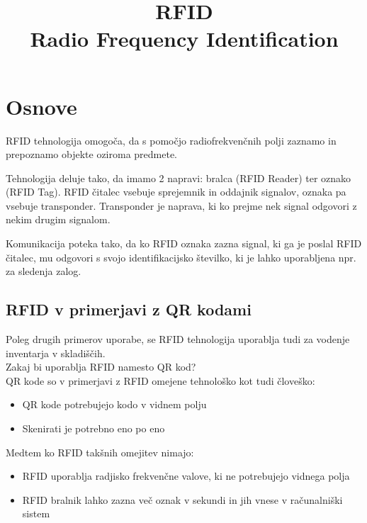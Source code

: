 \documentclass[]{article}
\title{RFID \\
       \large Radio Frequency Identification}
\date{}
\begin{document}
\maketitle

\clearpage

\tableofcontents

\clearpage

\section{Osnove}
RFID tehnologija omogo\v{c}a, da s pomo\v{c}jo radiofrekven\v{c}nih
polji zaznamo in prepoznamo objekte oziroma predmete.

Tehnologija deluje tako, da imamo 2 napravi: bralca (RFID Reader) ter
oznako (RFID Tag). RFID \v{c}italec vsebuje sprejemnik in oddajnik
signalov, oznaka pa vsebuje transponder. Transponder je naprava, ki
ko prejme nek signal odgovori z nekim drugim signalom.

Komunikacija poteka tako, da ko RFID oznaka zazna signal, ki ga je
poslal RFID \v{c}italec, mu odgovori s svojo identifikacijsko
\v{s}tevilko, ki je lahko uporabljena npr. za sledenja zalog.


\subsection{RFID v primerjavi z QR kodami}
Poleg drugih primerov uporabe, se RFID tehnologija uporablja
tudi za vodenje inventarja v skladi\v{s}\v{c}ih. \\

\noindent
Zakaj bi uporablja RFID namesto QR kod? \\
QR kode so v primerjavi z RFID omejene tehnolo\v{s}ko kot tudi
\v{c}love\v{s}ko:
\begin{itemize}
  \item QR kode potrebujejo kodo v vidnem polju
  \item Skenirati je potrebno eno po eno
\end{itemize}

\noindent
Medtem ko RFID tak\v{s}nih omejitev nimajo:
\begin{itemize}
    \item RFID uporablja radjisko frekven\v{c}ne valove, ki ne
      potrebujejo vidnega polja
    \item RFID bralnik lahko zazna ve\v{c} oznak v sekundi in jih
      vnese v ra\v{c}unalni\v{s}ki sistem
\end{itemize}
\end{document}
